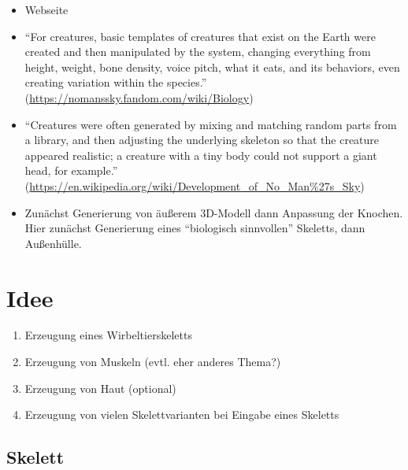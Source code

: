 \begin{itemize}
 \item Webseite \cite{NoMansSky}
 \item "`For creatures, basic templates of creatures that exist on the Earth were created and then manipulated by the system, changing everything from height, weight, bone density, voice pitch, what it eats, and its behaviors, even creating variation within the species."' (\url{https://nomanssky.fandom.com/wiki/Biology})
 \item "`Creatures were often generated by mixing and matching random parts from a library, and then adjusting the underlying skeleton so that the creature appeared realistic; a creature with a tiny body could not support a giant head, for example."' (\url{https://en.wikipedia.org/wiki/Development_of_No_Man\%27s_Sky})
 \item Zunächst Generierung von äußerem 3D-Modell dann Anpassung der Knochen. Hier zunächst Generierung eines "`biologisch sinnvollen"' Skeletts, dann Außenhülle.
\end{itemize}


\chapter{Idee}

\begin{enumerate}
 \item Erzeugung eines Wirbeltierskeletts
 \item Erzeugung von Muskeln (evtl. eher anderes Thema?)
 \item Erzeugung von Haut (optional)
 \item Erzeugung von vielen Skelettvarianten bei Eingabe eines Skeletts
\end{enumerate}

\section{Skelett}

